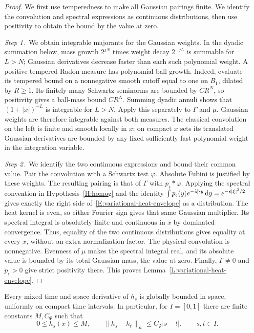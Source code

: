 \begin{proof}
  We first use temperedness to make all Gaussian pairings finite. We identify
  the convolution and spectral expressions as continuous distributions, then
  use positivity to obtain the bound by the value at zero.


  \medskip
  \noindent\textit{Step 1.~}We obtain integrable majorants for the Gaussian
  weights.
  In the dyadic summation below, mass growth $2^{jN}$ times weight decay
  $2^{-jL}$ is summable for $L>N$; Gaussian derivatives decrease faster than
  each such polynomial weight.
  A positive tempered Radon measure has polynomial ball growth. Indeed, evaluate
  its tempered bound on a nonnegative smooth cutoff equal to one on $B_1$,
  dilated by $R \ge 1$. Its finitely many Schwartz seminorms are bounded by
  $CR^N$, so positivity gives a ball-mass bound $CR^N$. Summing dyadic annuli
  shows that $(1+|x|)^{-L}$ is integrable for $L > N$. Apply this separately to
  $\Gamma$ and $\mu$. Gaussian weights are therefore integrable against both
  measures. The classical convolution on the left is finite and smooth locally
  in $x$: on compact $x$ sets its translated Gaussian derivatives are bounded by
  any fixed sufficiently fast polynomial weight in the integration variable.


  \medskip
  \noindent\textit{Step 2.~}We identify the two continuous expressions and
  bound their common value.
  Pair the convolution with a Schwartz test $\varphi$. Absolute Fubini is
  justified by these weights. The resulting pairing is that of $\Gamma$ with
  $p_\epsilon*\varphi$. Applying the spectral convention in
  Hypothesis~\ref{H:homog} and the identity $\int p_\epsilon(y)e^{-i\xi\cdot
  y}\,\mathrm{d} y = e^{-\epsilon|\xi|^2/2}$ gives exactly the right side
  of~\eqref{E:variational-heat-envelope} as a distribution. The heat kernel is
  even, so either Fourier sign gives that same Gaussian multiplier. Its spectral
  integral is absolutely finite and continuous in $x$ by dominated convergence.
  Thus, equality of the two continuous distributions gives equality at every
  $x$, without an extra normalization factor. The physical convolution is
  nonnegative. Evenness of $\mu$ makes the spectral integral real, and its
  absolute value is bounded by its total Gaussian mass, the value at zero.
  Finally, $\Gamma \ne 0$ and $p_\epsilon > 0$ give strict positivity there.
  This proves Lemma~\ref{L:variational-heat-envelope}.
\end{proof}

\begin{lemma}
  \label{L:variational-global-mean}
  Every mixed time and space derivative of $h_s$ is globally bounded in space,
  uniformly on compact time intervals. In particular, for $I = [0,1]$ there are
  finite constants $M,C_\Psi$ such that
  \begin{equation}\label{E:variational-global-mean}
    0\le h_s(x)\le M,\qquad
    \|h_s-h_t\|_\infty\le C_\Psi|s-t|,
    \qquad s,t\in I.
  \end{equation}
\end{lemma}

